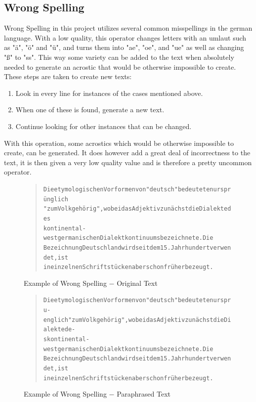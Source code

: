 \documentclass[11pt]{reportAlternative}
\begin{document}
\subsection{Wrong Spelling}
Wrong Spelling in this project utilizes several common misspellings in the german language. With a low quality, this operator changes letters with an umlaut such as "ä", "ö" and "ü", and turns them into "ae", "oe", and "ue" as well as changing "ß" to "ss". This way some variety can be added to the text when absolutely needed to generate an acrostic that would be otherwise impossible to create.
These steps are taken to create new texts:
\begin{enumerate}
\item Look in every line for instances of the cases mentioned above.
\item When one of these is found, generate a new text.
\item Continue looking for other instances that can be changed.
\end{enumerate}
With this operation, some acrostics which would be otherwise impossible to create, can be generated. It does however add a great deal of incorrectness to the text, it is then given a very low quality value and is therefore a pretty uncommon operator.

\begin{figure}[H]
	\begin{quote}
		\begin{alltt}
			Die etymologischen Vorformen von "deutsch" bedeuteten ursprünglich 
			"zum Volk gehörig", wobei das Adjektiv zunächst die Dialekte des 
			kontinental-westgermanischen Dialektkontinuums bezeichnete. Die 
			Bezeichnung Deutschland wird seit dem 15. Jahrhundert verwendet, ist
			in einzelnen Schriftstücken aber schon früher bezeugt.
		\end{alltt}
	\end{quote}
	\caption{Example of Wrong Spelling $-$ Original Text}
\end{figure}

\begin{figure}[H]
	\begin{quote}
		\begin{alltt}
			Die etymologischen Vorformen von "deutsch" bedeuteten urspru- 
			englich "zum Volk gehörig", wobei das Adjektiv zunächst die Dialekte de- 
			s kontinental-westgermanischen Dialektkontinuums bezeichnete. Die 
			Bezeichnung Deutschland wird seit dem 15. Jahrhundert verwendet, ist 
			in einzelnen Schriftstücken aber schon früher bezeugt. 
		\end{alltt}
	\end{quote}
	\caption{Example of Wrong Spelling $-$ Paraphrased Text}
\end{figure}
\end{document}

